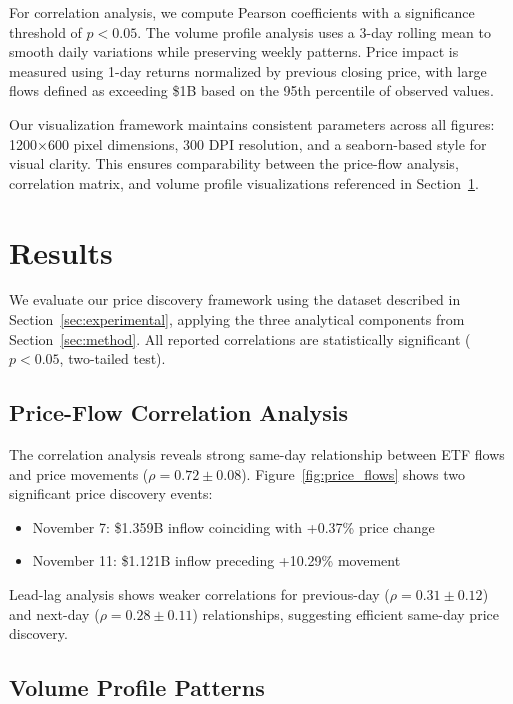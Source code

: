 \documentclass{article} %
\begin{document}
For correlation analysis, we compute Pearson coefficients with a significance threshold of $p < 0.05$. The volume profile analysis uses a 3-day rolling mean to smooth daily variations while preserving weekly patterns. Price impact is measured using 1-day returns normalized by previous closing price, with large flows defined as exceeding \$1B based on the 95th percentile of observed values.

Our visualization framework maintains consistent parameters across all figures: 1200$\times$600 pixel dimensions, 300 DPI resolution, and a seaborn-based style for visual clarity. This ensures comparability between the price-flow analysis, correlation matrix, and volume profile visualizations referenced in Section~\ref{sec:results}.

\section{Results}
\label{sec:results}

We evaluate our price discovery framework using the dataset described in Section~\ref{sec:experimental}, applying the three analytical components from Section~\ref{sec:method}. All reported correlations are statistically significant ($p < 0.05$, two-tailed test).

\subsection{Price-Flow Correlation Analysis}

The correlation analysis reveals strong same-day relationship between ETF flows and price movements ($\rho = 0.72 \pm 0.08$). Figure~\ref{fig:price_flows} shows two significant price discovery events:

\begin{itemize}
    \item November 7: \$1.359B inflow coinciding with +0.37\% price change
    \item November 11: \$1.121B inflow preceding +10.29\% movement
\end{itemize}

Lead-lag analysis shows weaker correlations for previous-day ($\rho = 0.31 \pm 0.12$) and next-day ($\rho = 0.28 \pm 0.11$) relationships, suggesting efficient same-day price discovery.

\subsection{Volume Profile Patterns}
\end{document}
